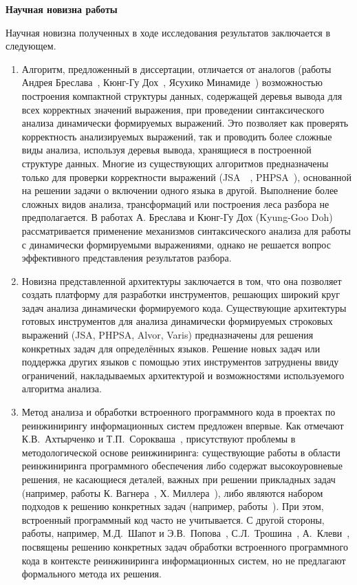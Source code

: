 \textbf{Научная новизна работы}

Научная новизна полученных в ходе исследования результатов заключается в следующем.

\begin{enumerate}

\item Алгоритм, предложенный в диссертации, отличается от аналогов (работы Андрея Бреслава~\cite{Alvor1, Alvor2}, Кюнг-Гу Дох~\cite{LrAbstract1, LrAbstract2}, Ясухико Минамиде~\cite{PHPSA}) возможностью построения компактной структуры данных, содержащей деревья вывода для всех корректных значений выражения, при проведении синтаксического анализа динамически формируемых выражений. Это позволяет как проверять корректность анализируемых выражений, так и проводить более сложные виды анализа, используя деревья вывода, хранящиеся в построенной структуре данных. Многие из существующих алгоритмов предназначены только для проверки корректности выражений (JSA~\cite{JSA}~\cite{Alvor1, Alvor2}, PHPSA~\cite{PHPSA}), основанной на решении задачи о включении одного языка в другой. Выполнение более сложных видов анализа, трансформаций или построения леса разбора не предполагается. В работах А. Бреслава и Кюнг-Гу Дох (Kyung-Goo Doh)~\cite{LrAbstract1, LrAbstract2} рассматривается применение механизмов синтаксического анализа для работы с динамически формируемыми выражениями, однако не решается вопрос 
эффективного представления результатов разбора. 

\item Новизна представленной архитектуры заключается в том, что она позволяет создать платформу для разработки инструментов, решающих широкий круг задач анализа динамически формируемого кода. Существующие архитектуры готовых инструментов для анализа динамически формируемых строковых выражений (JSA, PHPSA, Alvor, Varis) предназначены для решения конкретных задач для определённых языков. Решение новых задач или поддержка других языков с помощью этих инструментов затруднены ввиду ограничений, накладываемых архитектурой и возможностями используемого алгоритма анализа. 

\item Метод анализа и обработки встроенного программного кода в проектах по реинжинирингу информационных систем предложен впервые. Как отмечают К.В.~Ахтырченко и Т.П.~Сорокваша~\cite{SoftwareReengMethods}, присутствуют проблемы в методологической основе реинжиниринга: существующие работы в области реинжиниринга программного обеспечения либо содержат высокоуровневые решения, не касающиеся деталей, важных при решении прикладных задач (например, работы К. Вагнера~\cite{SoftwareReeng3}, Х. Миллера~\cite{SoftwareReeng2}), либо являются набором подходов к решению конкретных задач (например, работы~\cite{SoftwareReeng1, reengANT}). При этом, встроенный программный код часто не учитывается. С другой стороны, работы, например, М.Д.~Шапот и Э.В.~Попова~\cite{DynamicDSQLTranslation}, С.Л.~Трошина~\cite{reengANT}, А.~Клеви~\cite{DSQLReverseEngineering},  посвящены решению конкретных задач обработки встроенного программного кода в контексте реинжиниринга информационных систем, но не предлагают формального метода их решения.

\end{enumerate}


